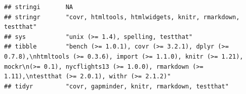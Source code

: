 \documentclass[]{article}
\begin{document}
\begin{verbatim}
## stringi       NA                                                                                                                                                                                                                                                                                                                                                                                                                                                                                                                                                                                        
## stringr       "covr, htmltools, htmlwidgets, knitr, rmarkdown, testthat"                                                                                                                                                                                                                                                                                                                                                                                                                                                                                                                                
## sys           "unix (>= 1.4), spelling, testthat"                                                                                                                                                                                                                                                                                                                                                                                                                                                                                                                                                       
## tibble        "bench (>= 1.0.1), covr (>= 3.2.1), dplyr (>= 0.7.8),\nhtmltools (>= 0.3.6), import (>= 1.1.0), knitr (>= 1.21), mockr\n(>= 0.1), nycflights13 (>= 1.0.0), rmarkdown (>= 1.11),\ntestthat (>= 2.0.1), withr (>= 2.1.2)"                                                                                                                                                                                                                                                                                                                                                                   
## tidyr         "covr, gapminder, knitr, rmarkdown, testthat"                                                                                                                                                                                                                                                                                                                                                                                                                                                                                                                                             

\end{verbatim}
\end{document}
